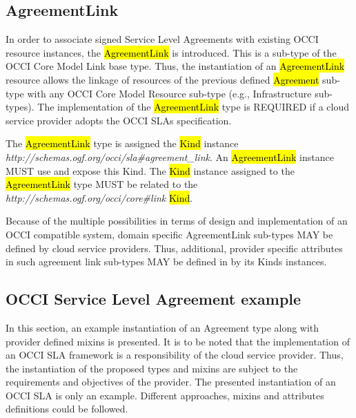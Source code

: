 \documentclass[10pt,a4paper]{article}
\begin{document}
\subsection{AgreementLink}
In order to associate signed Service Level Agreements with existing OCCI resource instances, the \hl{AgreementLink} is introduced. This is a sub-type of the OCCI Core Model Link base type. Thus, the instantiation of an \hl{AgreementLink} resource allows the linkage of resources of the previous defined \hl{Agreement} sub-type with any OCCI Core Model Resource sub-type (e.g., Infrastructure sub-types). The implementation of the \hl{AgreementLink} type is REQUIRED if a cloud service provider adopts the OCCI SLAs specification.

The \hl{AgreementLink} type is assigned the \hl{Kind} instance \textit{http://schemas.ogf.org/occi/sla\#agreement\_link}. An \hl{AgreementLink} instance MUST use and expose this Kind. The \hl{Kind} instance assigned to the \hl{AgreementLink} type MUST be related to the \textit{http://schemas.ogf.org/occi/core\#link} \hl{Kind}.

Because of the multiple possibilities in terms of design and implementation of an OCCI compatible system, domain specific AgreementLink sub-types MAY be defined by cloud service providers. Thus, additional, provider specific attributes in such agreement link sub-types MAY be defined in by its Kinds instances.


\subsection{OCCI Service Level Agreement example}

In this section, an example instantiation of an Agreement type along with provider defined mixins is presented. It is to be noted that the implementation of an OCCI SLA framework is a responsibility of the cloud service provider. Thus, the instantiation of the proposed types and mixins are subject to the requirements and objectives of the provider. The presented instantiation of an OCCI SLA is only an example. Different approaches, mixins and attributes definitions could be followed.
\end{document}
